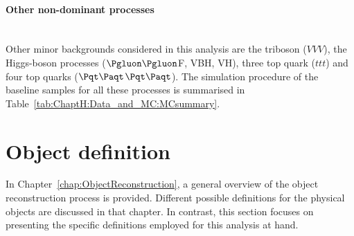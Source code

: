 \paragraph{Other non-dominant processes}\mbox{}\\
Other minor backgrounds considered in this analysis are the triboson ($VVV$), 
the Higgs-boson processes ($\Pgluon\Pgluon$F, VBH, VH), three top quark ($t$$t$$t$)
and four top quarks ($\ttbar$$\ttbar$). The simulation procedure of the baseline samples for all these 
processes is summarised in Table~\ref{tab:ChaptH:Data_and_MC:MCsummary}.






\section{Object definition}
\label{sec:ChaptH:ObjectDefReco}
In Chapter~\ref{chap:ObjectReconstruction}, a general overview of the object 
reconstruction process is provided. Different possible definitions for the 
physical objects are discussed in that chapter. 
In contrast, this section focuses on presenting the 
specific definitions employed for this analysis at hand.




